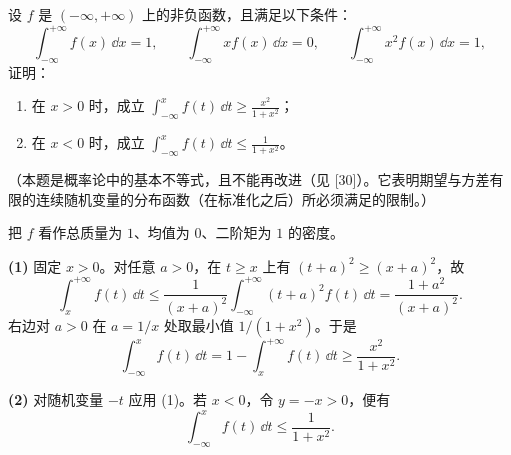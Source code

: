 \begin{xreferenceproblem}[9]
设 $f$ 是 $(-\infty,+\infty)$ 上的非负函数，且满足以下条件：
  \[
    \int_{-\infty}^{+\infty}f(x)\,\dd x=1,\qquad
    \int_{-\infty}^{+\infty}xf(x)\,\dd x=0,\qquad
    \int_{-\infty}^{+\infty}x^2f(x)\,\dd x=1,
  \]
  证明：
  \begin{enumerate}[label=(\arabic*)]
    \item 在 $x>0$ 时，成立 $\displaystyle\int_{-\infty}^x f(t)\,\dd t\geq\frac{x^2}{1+x^2}$；
    \item 在 $x<0$ 时，成立 $\displaystyle\int_{-\infty}^x f(t)\,\dd t\leq\frac1{1+x^2}$。
  \end{enumerate}
  （本题是概率论中的基本不等式，且不能再改进（见 [30]）。它表明期望与方差有限的连续随机变量的分布函数（在标准化之后）所必须满足的限制。）
\end{xreferenceproblem}
\begin{xsolution}
把 $f$ 看作总质量为 $1$、均值为 $0$、二阶矩为 $1$ 的密度。

\textbf{(1)} 固定 $x>0$。对任意 $a>0$，在 $t\geq x$ 上有 $(t+a)^2\geq(x+a)^2$，故
\[
  \int_x^{+\infty}f(t)\,\dd t
  \leq\frac1{(x+a)^2}\int_{-\infty}^{+\infty}(t+a)^2f(t)\,\dd t
  =\frac{1+a^2}{(x+a)^2}.
\]
右边对 $a>0$ 在 $a=1/x$ 处取最小值 $1/(1+x^2)$。于是
\[
  \int_{-\infty}^x f(t)\,\dd t
  =1-\int_x^{+\infty}f(t)\,\dd t
  \geq\boxed{\frac{x^2}{1+x^2}}.
\]

\textbf{(2)} 对随机变量 $-t$ 应用 (1)。若 $x<0$，令 $y=-x>0$，便有
\[
  \int_{-\infty}^{x}f(t)\,\dd t
  \leq\boxed{\frac1{1+x^2}}.
\]
\end{xsolution}


